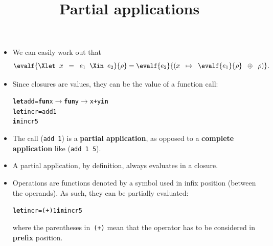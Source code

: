 \documentclass[wide]{slides}
\begin{document}
\begin{slide}
  \title{Partial applications}

  \begin{itemize}

  \item We can easily work out that
      \begin{equation*}
        \evalf{\Xlet \;\; x \;\; = \;\; e_1 \;\; \Xin \;\; e_2}{\rho}
        = \evalf{e_2}{(x \;\; \mapsto \;\; \evalf{e_1}{\rho} \;\;
          \oplus \;\; \rho)}.
      \end{equation*}

    \item Since closures are values, they can be the value of a
      function call:
      \smallskip
\begin{alltt}
\textbf{let} add = \textbf{fun} x \(\rightarrow\) \textbf{fun} y \(\rightarrow\) x + y \textbf{in}
\textbf{let} incr = add 1
\textbf{in} incr 5
\end{alltt}

    \item The call (\texttt{add 1}) is a \textbf{partial application},
      as opposed to a \textbf{complete application} like (\texttt{add 1
        5}).

    \item A partial application, by definition, always evaluates in a
      closure.

    \item Operations are functions denoted by a symbol used in infix
      position (between the operands). As such, they can be partially
      evaluated:
      \smallskip
\begin{alltt}
\textbf{let} incr = (+) 1 \textbf{in} incr 5
\end{alltt}
     \smallskip
     \noindent where the parentheses in~\texttt{(+)} mean that the
     operator has to be considered in \textbf{prefix} position.

  \end{itemize}

\end{slide}
\end{document}
